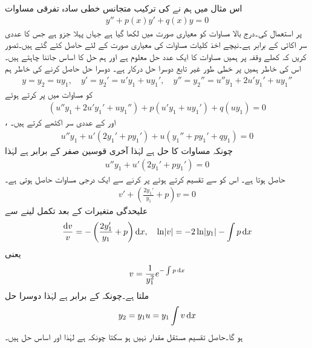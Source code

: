 اس مثال میں ہم نے  کی ترکیب متجانس خطی سادہ تفرقی مساوات 
\begin{align}\label{مساوات_سادہ_دو_درجی_متجانس_تخفیف_الف}
y''+p(x)y'+q(x)y=0
\end{align}
پر استعمال کی۔درج بالا مساوات کو معیاری صورت میں لکھا گیا ہے جہاں پہلا جزو  ہے جس کا عددی سر اکائی کے برابر ہے۔نیچے اخذ کلیات مساوات کی معیاری صورت کے لئے حاصل کئے گئے ہیں۔تصور کریں کہ کھلے وقفہ  پر ہمیں مساوات  کا ایک عدد حل  معلوم ہے اور ہم حل کا اساس جاننا چاہتے ہیں۔ اس کی خاطر ہمیں  پر خطی طور غیر تابع دوسرا حل  درکار ہے۔  دوسرا حل حاصل کرنے کی خاطر ہم
\begin{align*}
y=y_2=uy_1, \quad y'=y_2'=u'y_1+uy_1',\quad y''=y_2''=u''y_1+2u'y_1'+uy_1''
\end{align*}
کو مساوات  میں پر کرتے ہوئے 
\begin{align*}
(u''y_1+2u'y_1'+uy_1'')+p(u'y_1+uy_1')+q(uy_1)=0
\end{align*}
،  اور  کے عددی سر اکٹھے کرتے ہیں۔
\begin{align*}
u''y_1+u'(2y_1'+py_1')+u(y_1''+py_1'+qy_1)=0
\end{align*}
چونکہ  مساوات  کا حل ہے لہٰذا آخری قوسین صفر کے برابر ہے لہٰذا
\begin{align*}
u''y_1+u'(2y_1'+py_1')=0
\end{align*}
حاصل ہوتا ہے۔ اس کو   سے تقسیم کرتے ہوئے  پر کرنے سے  ایک درجی مساوات حاصل ہوتی ہے۔
 \begin{align*}
v'+\left(\frac{2y_1'}{y_1}+p\right)v=0
\end{align*}
علیحدگی متغیرات کے بعد تکمل لینے سے
\begin{align*}
\frac{\dif v}{v}=-\left(\frac{2y_1'}{y_1}+p\right) \dif x, \quad \ln \abs{v}=-2\ln \abs{y_1}-\int p \dif x
\end{align*}
یعنی
\begin{align}
v=\frac{1}{y_1^2}e^{-\int p\dif x}
\end{align}
ملتا ہے۔چونکہ  کے برابر ہے لہٰذا دوسرا حل
\begin{align}
y_2=y_1u=y_1 \int v \dif x
\end{align}
ہو گا۔حاصل تقسیم  مستقل مقدار نہیں ہو سکتا چونکہ  ہے لہٰذا  اور  اساس حل ہیں۔

